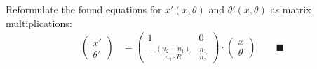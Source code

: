 \documentclass{article}
\begin{document}
{	Reformulate the found equations for $x'(x,\theta)$ and $\theta'(x,\theta)$ as matrix multiplications:
		\begin{align*}
			\begin{pmatrix}
				x' \\ \theta'
			\end{pmatrix}
			&=
			\begin{pmatrix}
				1 & 0 \\
				-\frac{(n_2 - n_1)}{n_2 \cdot R} & \frac{n_1}{n_2}
			\end{pmatrix}
			\cdot
			\begin{pmatrix}
				x \\ \theta
			\end{pmatrix}
			\qquad \blacksquare
		\end{align*}






}
\end{document}
